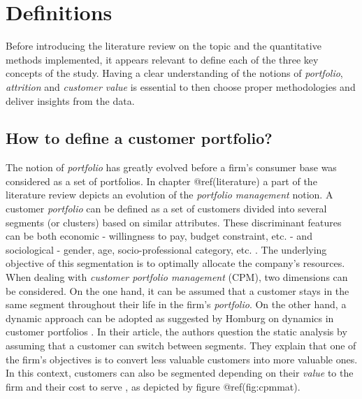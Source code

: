 \documentclass[
]{book}
\begin{document}
\hypertarget{definitions}{%
\chapter{Definitions}\label{definitions}}

Before introducing the literature review on the topic and the quantitative methods implemented, it appears relevant to define each of the three key concepts of the study. Having a clear understanding of the notions of \emph{portfolio}, \emph{attrition} and \emph{customer value} is essential to then choose proper methodologies and deliver insights from the data.

\hypertarget{how-to-define-a-customer-portfolio}{%
\section{How to define a customer portfolio?}\label{how-to-define-a-customer-portfolio}}

The notion of \emph{portfolio} has greatly evolved before a firm's consumer base was considered as a set of portfolios. In chapter @ref(literature) a part of the literature review depicts an evolution of the \emph{portfolio management} notion. A customer \emph{portfolio} can be defined as a set of customers divided into several segments (or clusters) based on similar attributes. These discriminant features can be both economic - willingness to pay, budget constraint, etc. - and sociological - gender, age, socio-professional category, etc. . The underlying objective of this segmentation is to optimally allocate the company's resources. When dealing with \emph{customer portfolio management} (CPM), two dimensions can be considered. On the one hand, it can be assumed that a customer stays in the same segment throughout their life in the firm's \emph{portfolio}. On the other hand, a dynamic approach can be adopted as suggested by Homburg on dynamics in customer portfolios \citep{MANAGING_DYNAMICS_CUSTOMER_PORTFOLIO}. In their article, the authors question the static analysis by assuming that a customer can switch between segments. They explain that one of the firm's objectives is to convert less valuable customers into more valuable ones. In this context, customers can also be segmented depending on their \emph{value} to the firm and their cost to serve \citep{CPM_CRM}, as depicted by figure @ref(fig:cpmmat).
\end{document}
